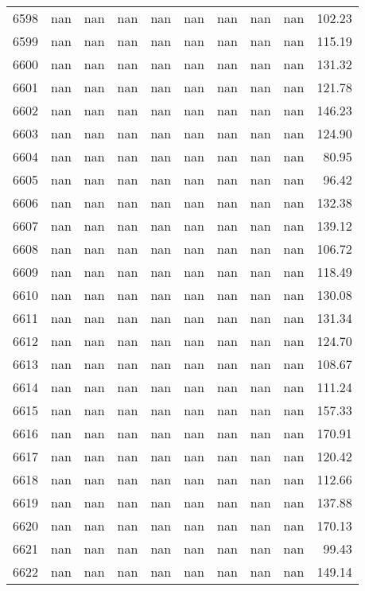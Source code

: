 \begin{tabular}{lrrrrrrrrr}
6598 & nan & nan & nan & nan & nan & nan & nan & nan & 102.23 \\
6599 & nan & nan & nan & nan & nan & nan & nan & nan & 115.19 \\
6600 & nan & nan & nan & nan & nan & nan & nan & nan & 131.32 \\
6601 & nan & nan & nan & nan & nan & nan & nan & nan & 121.78 \\
6602 & nan & nan & nan & nan & nan & nan & nan & nan & 146.23 \\
6603 & nan & nan & nan & nan & nan & nan & nan & nan & 124.90 \\
6604 & nan & nan & nan & nan & nan & nan & nan & nan & 80.95 \\
6605 & nan & nan & nan & nan & nan & nan & nan & nan & 96.42 \\
6606 & nan & nan & nan & nan & nan & nan & nan & nan & 132.38 \\
6607 & nan & nan & nan & nan & nan & nan & nan & nan & 139.12 \\
6608 & nan & nan & nan & nan & nan & nan & nan & nan & 106.72 \\
6609 & nan & nan & nan & nan & nan & nan & nan & nan & 118.49 \\
6610 & nan & nan & nan & nan & nan & nan & nan & nan & 130.08 \\
6611 & nan & nan & nan & nan & nan & nan & nan & nan & 131.34 \\
6612 & nan & nan & nan & nan & nan & nan & nan & nan & 124.70 \\
6613 & nan & nan & nan & nan & nan & nan & nan & nan & 108.67 \\
6614 & nan & nan & nan & nan & nan & nan & nan & nan & 111.24 \\
6615 & nan & nan & nan & nan & nan & nan & nan & nan & 157.33 \\
6616 & nan & nan & nan & nan & nan & nan & nan & nan & 170.91 \\
6617 & nan & nan & nan & nan & nan & nan & nan & nan & 120.42 \\
6618 & nan & nan & nan & nan & nan & nan & nan & nan & 112.66 \\
6619 & nan & nan & nan & nan & nan & nan & nan & nan & 137.88 \\
6620 & nan & nan & nan & nan & nan & nan & nan & nan & 170.13 \\
6621 & nan & nan & nan & nan & nan & nan & nan & nan & 99.43 \\
6622 & nan & nan & nan & nan & nan & nan & nan & nan & 149.14 \\

\end{tabular}
